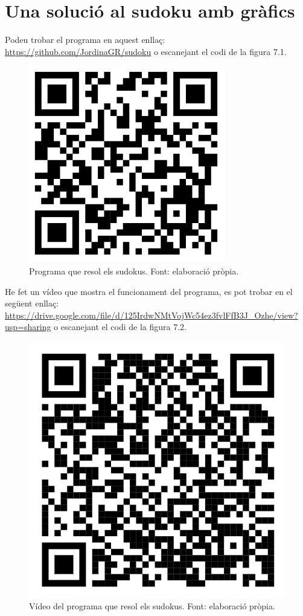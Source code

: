 \section{Una solució al sudoku amb gràfics}
Podeu trobar el programa en aquest enllaç: \url{https://github.com/JordinaGR/sudoku} o escanejant el codi de la figura 7.1.
\begin{figure}[H]
    \centering
    \includegraphics[width=.15\textwidth]{capitols/figures/qr2.png}
    \caption[Programa que resol els sudokus.]{Programa que resol els sudokus. Font: elaboració pròpia.}
    \label{fig:my_label}
\end{figure}

He fet un vídeo que mostra el funcionament del programa, es pot trobar en el següent enllaç: \url{https://drive.google.com/file/d/125IrdwNMtVojWc54ez3fvlFfB3J_Ozhe/view?usp=sharing} o escanejant el codi de la figura 7.2.
\begin{figure}[H]
    \centering
    \includegraphics[width=.15\textwidth]{capitols/figures/10.png}
    \caption[Vídeo del programa que resol els sudokus.]{Vídeo del programa que resol els sudokus. Font: elaboració pròpia.}
    \label{fig:my_label}
\end{figure}

